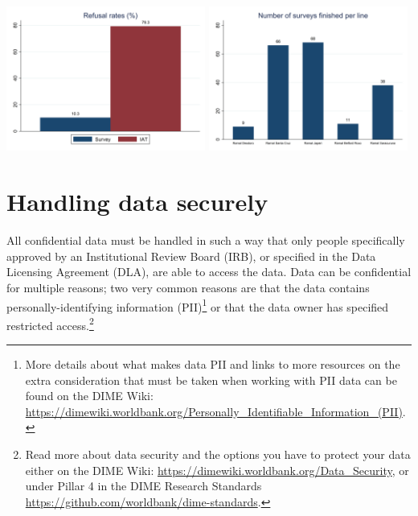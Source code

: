\documentclass[
]{book}
\begin{document}
\begin{ex}
\includegraphics[width=0.49\textwidth,height=\textheight]{examples/quality-checks-fig1.png}
\includegraphics[width=0.49\textwidth,height=\textheight]{examples/quality-checks-fig2.png}
\end{ex}

\hypertarget{handling-data-securely}{%
\section*{Handling data securely}\label{handling-data-securely}}

All confidential data must be handled in such a way that only people specifically
approved by an Institutional Review Board (IRB),
or specified in the Data Licensing Agreement (DLA),
are able to access the data.
Data can be confidential for multiple reasons;
two very common reasons are that the data contains
personally-identifying information (PII)\footnote{More details about what makes data PII and
  links to more resources on the extra consideration that
  must be taken when working with PII data
  can be found on the DIME Wiki:
  \url{https://dimewiki.worldbank.org/Personally_Identifiable_Information_(PII)}.}
or that the data owner has specified restricted access.\footnote{Read more about data security and the options you have to protect your data
  either on the DIME Wiki:
  \url{https://dimewiki.worldbank.org/Data_Security},
  or under Pillar 4 in the DIME Research Standards
  \url{https://github.com/worldbank/dime-standards}.}
\end{document}
